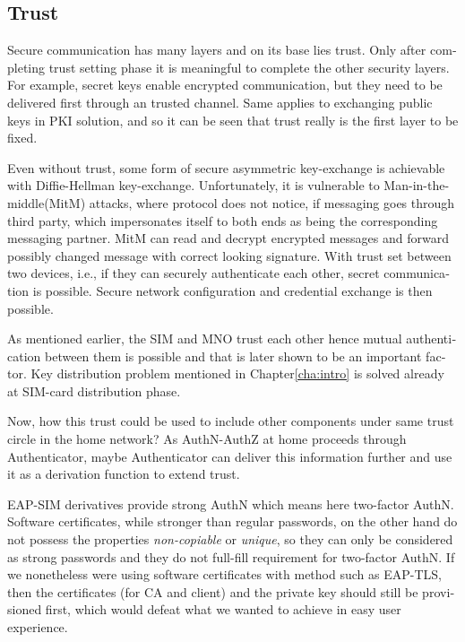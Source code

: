 \documentclass[12pt,a4paper,english]{tutthesis}
\begin{document}
\begin{otherlanguage}{english}
\section{Trust}
\label{sec-2-6}

Secure communication has many layers and on its base lies trust. 
Only after completing trust setting phase it is meaningful to complete
the other security layers. For example, secret keys enable encrypted
communication, but they need to be delivered first through an trusted
channel. Same applies to exchanging public keys in PKI solution,
 and so it can be seen that trust really is the first layer to
be fixed.



Even without trust, some form of secure asymmetric key-exchange is achievable
with Diffie-Hellman key-exchange\cite{diffie1976new}. Unfortunately, it is vulnerable
to Man-in-the-middle(MitM) attacks, where protocol does not notice, 
if messaging goes through third party, which impersonates itself to 
both ends as being the corresponding messaging partner. MitM can
read and decrypt encrypted messages and forward possibly changed message with
correct looking signature.
With trust set between two devices, i.e.,  if they can securely
authenticate each other, secret communication is possible. 
Secure network configuration and credential exchange is then possible.


As mentioned earlier, the SIM and MNO trust each other hence mutual
authentication between them is possible and that is later shown to be
an important factor.  
Key distribution problem mentioned in Chapter\ref{cha:intro} is solved
already at SIM-card distribution phase. 

Now, how this trust could be used to include other components under
same trust circle in the home network?  As AuthN-AuthZ at home proceeds
through Authenticator, maybe Authenticator can deliver this
information further and use it as a derivation function to extend
trust.

EAP-SIM derivatives provide strong AuthN which means here two-factor
AuthN. Software certificates, while stronger than regular passwords,
on the other hand do not possess the properties \emph{non-copiable} or
\emph{unique}, so they can only be considered as strong passwords and they
do not full-fill requirement for two-factor AuthN.  If we nonetheless
were using software certificates with method such as EAP-TLS, then the
certificates (for CA and client) and the private key should still be
provisioned first, which would defeat what we wanted to achieve in
easy user experience.




\end{otherlanguage}
\end{document}
